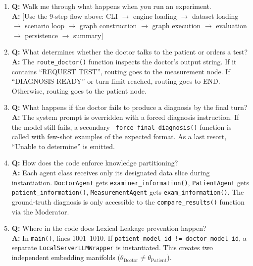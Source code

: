 \begin{vivabox}[\textcolor{white}{Likely Viva Questions}]
\begin{enumerate}
    \item \textbf{Q:} Walk me through what happens when you run an experiment.\\
    \textbf{A:} [Use the 9-step flow above: CLI $\rightarrow$ engine loading $\rightarrow$ dataset loading $\rightarrow$ scenario loop $\rightarrow$ graph construction $\rightarrow$ graph execution $\rightarrow$ evaluation $\rightarrow$ persistence $\rightarrow$ summary]

    \item \textbf{Q:} What determines whether the doctor talks to the patient or orders a test?\\
    \textbf{A:} The \texttt{route\_doctor()} function inspects the doctor's output string. If it contains ``REQUEST TEST'', routing goes to the measurement node. If ``DIAGNOSIS READY'' or turn limit reached, routing goes to END. Otherwise, routing goes to the patient node.

    \item \textbf{Q:} What happens if the doctor fails to produce a diagnosis by the final turn?\\
    \textbf{A:} The system prompt is overridden with a forced diagnosis instruction. If the model still fails, a secondary \texttt{\_force\_final\_diagnosis()} function is called with few-shot examples of the expected format. As a last resort, ``Unable to determine'' is emitted.

    \item \textbf{Q:} How does the code enforce knowledge partitioning?\\
    \textbf{A:} Each agent class receives only its designated data slice during instantiation. \texttt{DoctorAgent} gets \texttt{examiner\_information()}, \texttt{PatientAgent} gets \texttt{patient\_information()}, \texttt{MeasurementAgent} gets \texttt{exam\_information()}. The ground-truth diagnosis is only accessible to the \texttt{compare\_results()} function via the Moderator.

    \item \textbf{Q:} Where in the code does Lexical Leakage prevention happen?\\
    \textbf{A:} In \texttt{main()}, lines 1001--1010. If \texttt{patient\_model\_id != doctor\_model\_id}, a separate \texttt{LocalServerLLMWrapper} is instantiated. This creates two independent embedding manifolds ($\theta_{\text{Doctor}} \neq \theta_{\text{Patient}}$).


\end{enumerate}
\end{vivabox}
